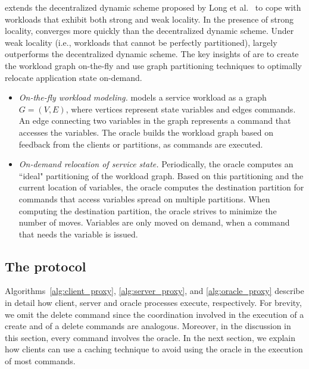 \dynastar extends the decentralized dynamic scheme proposed by Long et al.~\cite{hoang2016} to cope with workloads that exhibit both strong and weak locality.
In the presence of strong locality, \dynastar converges more quickly than the decentralized dynamic scheme.
Under weak locality (i.e., workloads that cannot be perfectly partitioned), \dynastar largely outperforms the decentralized dynamic scheme.
The key insights of \dynastar are to create the workload graph on-the-fly and use graph partitioning techniques to optimally relocate application state on-demand.
\begin{itemize}
\item \emph{On-the-fly workload modeling.}
\dynastar models a service workload as a graph $G = (V, E)$, where vertices represent state variables and edges commands.
An edge connecting two variables in the graph represents a command that accesses the variables. 
The oracle builds the workload graph based on feedback from the clients or partitions, as commands are executed.
\item \emph{On-demand relocation of service state.}
Periodically, the oracle computes an ``ideal" partitioning of the workload graph.
Based on this partitioning and the current location of variables, the oracle computes the destination partition for commands that access variables spread on multiple partitions.
When computing the destination partition, the oracle strives to minimize the number of moves.
Variables are only moved on demand, when a command that needs the variable is issued.
\end{itemize}




\subsection{The \dynastar protocol}

Algorithms~\ref{alg:client_proxy}, \ref{alg:server_proxy}, and \ref{alg:oracle_proxy} describe in detail how client, server and oracle processes execute, respectively.
For brevity, we omit the delete command since the coordination involved in the execution of a create and of a delete commands are analogous. 
Moreover, in the discussion in this section, every command involves the oracle.
In the next section, we explain how clients can use a caching technique to avoid using the oracle in the execution of most commands.

